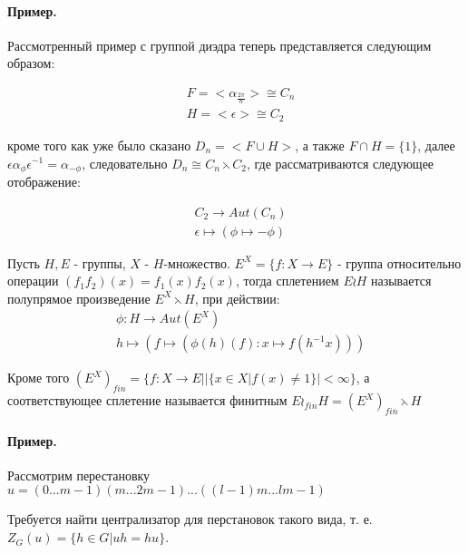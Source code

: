 \paragraph{Пример.} Рассмотренный пример с группой диэдра теперь представляется следующим образом:

\[
	\begin{split}
		& F = <\alpha_{\frac{2\pi}{n}}> \cong C_n \\
		& H = <\epsilon> \cong C_2
	\end{split}
\]

кроме того как уже было сказано $D_n = <F \cup H>$, а также $F \cap H = \lbrace 1 \rbrace$, далее $\epsilon \alpha_\phi \epsilon^{-1} = \alpha_{-\phi}$, следовательно $D_n \cong C_n \leftthreetimes C_2$, где рассматриваются следующее отображение:

\[
	\begin{split}
		& C_2 \rightarrow Aut\left(C_n\right)\\
		& \epsilon \mapsto \left(\phi \mapsto -\phi\right)
	\end{split}
\]

\begin{Def}
Пусть $H,E$ - группы, $X$ - $H$-множество. $E^X = \lbrace f : X \rightarrow E\rbrace$ - группа относительно операции $\left(f_1f_2\right)\left(x\right) = f_1\left(x\right)f_2\left(x\right)$, тогда сплетением $E \wr H$ называется полупрямое произведение $E^X \leftthreetimes H$, при действии:
\[
	\begin{split}
		& \phi : H \rightarrow Aut\left(E^X\right)\\
		& h \mapsto \left(f \mapsto \left(\phi\left(h\right)\left(f\right) : x \mapsto f\left(h^{-1}x\right)\right)\right)
	\end{split}
\]

Кроме того $\left(E^X\right)_{fin} = \lbrace f : X \rightarrow E | \left|\lbrace x\in X | f\left(x\right)\not=1\rbrace\right|<\infty\rbrace$, а соответствующее сплетение называется финитным $E \wr_{fin} H = \left(E^X\right)_{fin} \leftthreetimes H$
\end{Def}

\paragraph{Пример.} Рассмотрим перестановку $u = \left(0 ... m-1\right)\left(m ... 2m-1\right)...\left(\left(l-1\right)m ... lm-1\right)$

Требуется найти централизатор для перстановок такого вида, т. е. $Z_G\left(u\right) = \lbrace h\in G | uh = hu \rbrace$.


